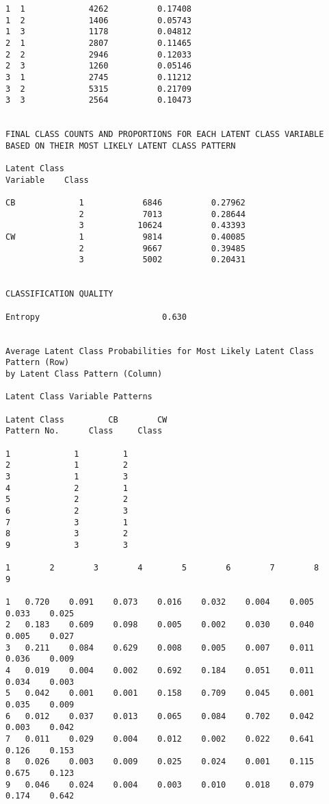 \begin{verbatim}
1  1             4262          0.17408
1  2             1406          0.05743
1  3             1178          0.04812
2  1             2807          0.11465
2  2             2946          0.12033
2  3             1260          0.05146
3  1             2745          0.11212
3  2             5315          0.21709
3  3             2564          0.10473


FINAL CLASS COUNTS AND PROPORTIONS FOR EACH LATENT CLASS VARIABLE
BASED ON THEIR MOST LIKELY LATENT CLASS PATTERN

Latent Class
Variable    Class

CB             1            6846          0.27962
               2            7013          0.28644
               3           10624          0.43393
CW             1            9814          0.40085
               2            9667          0.39485
               3            5002          0.20431


CLASSIFICATION QUALITY

Entropy                         0.630


Average Latent Class Probabilities for Most Likely Latent Class Pattern (Row)
by Latent Class Pattern (Column)

Latent Class Variable Patterns

Latent Class         CB        CW
Pattern No.      Class     Class

1             1         1
2             1         2
3             1         3
4             2         1
5             2         2
6             2         3
7             3         1
8             3         2
9             3         3

1        2        3        4        5        6        7        8        9

1   0.720    0.091    0.073    0.016    0.032    0.004    0.005    0.033    0.025
2   0.183    0.609    0.098    0.005    0.002    0.030    0.040    0.005    0.027
3   0.211    0.084    0.629    0.008    0.005    0.007    0.011    0.036    0.009
4   0.019    0.004    0.002    0.692    0.184    0.051    0.011    0.034    0.003
5   0.042    0.001    0.001    0.158    0.709    0.045    0.001    0.035    0.009
6   0.012    0.037    0.013    0.065    0.084    0.702    0.042    0.003    0.042
7   0.011    0.029    0.004    0.012    0.002    0.022    0.641    0.126    0.153
8   0.026    0.003    0.009    0.025    0.024    0.001    0.115    0.675    0.123
9   0.046    0.024    0.004    0.003    0.010    0.018    0.079    0.174    0.642




\end{verbatim}
